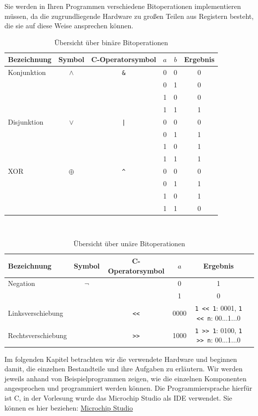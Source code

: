 \documentclass[11pt,a4paper]{scrartcl}
\begin{document}
Sie werden in Ihren Programmen verschiedene Bitoperationen implementieren müssen, da die zugrundliegende Hardware zu großen Teilen aus Registern besteht, die sie auf diese Weise ansprechen können.
\begin{table}[h]
\centering
\begin{tabular}{|l|c|c|c|c|c|}
\hline
Bezeichnung & Symbol & C-Operatorsymbol & $a$ & $b$ & Ergebnis \\
\hline
Konjunktion & $\land$ & \texttt{\&} & 0 & 0 & 0 \\
&&&0 & 1 & 0 \\
&&&1 & 0 & 0 \\
&&&1 & 1 & 1 \\
\hline
Disjunktion & $\lor$ & \texttt{|} & 0 & 0 & 0 \\
&&&0 & 1 & 1 \\
&&&1 & 0 & 1 \\
&&&1 & 1 & 1 \\
\hline
XOR & $\oplus$ & \texttt{\^} & 0 & 0 & 0 \\
&&&0 & 1 & 1 \\
&&&1 & 0 & 1 \\
&&&1 & 1 & 0 \\
\hline
\end{tabular}
\caption{Übersicht über binäre Bitoperationen}
\end{table} \\

\begin{table}[h]
\centering
\begin{tabular}{|l|c|c|c|c|c|}
\hline
Bezeichnung & Symbol & C-Operatorsymbol & $a$ & Ergebnis \\
\hline
Negation & $\lnot$ & \texttt{~} & 0 & 1 \\
&&&1 & 0 \\
\hline
Linksverschiebung & &\texttt{<<} & 0000 & \texttt{1 << 1}: 0001, \texttt{1 << n}: 00...1...0 \\
\hline
Rechtsverschiebung & & \texttt{>>} & 1000 & \texttt{1 >> 1}: 0100, \texttt{1 >> n}: 00...1...0 \\
\hline
\end{tabular}
\caption{Übersicht über unäre Bitoperationen}
\end{table}

Im folgenden Kapitel betrachten wir die verwendete Hardware und beginnen damit, die einzelnen Bestandteile und ihre Aufgaben zu erläutern. Wir werden jeweils anhand von Beispielprogrammen zeigen, wie die einzelnen Komponenten angesprochen und programmiert werden können. Die Programmiersprache hierfür ist C, in der Vorlesung wurde das {\glqq}Microchip Studio{\grqq} als IDE verwendet. Sie können es hier beziehen: 
\href{https://www.microchip.com/en-us/development-tools-tools-and-software/microchip-studio-for-avr-and-sam-devices}{Microchip Studio}
\end{document}
